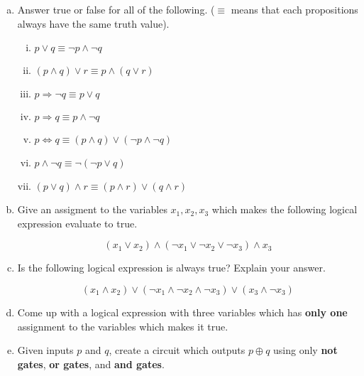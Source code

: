 \documentclass[12pt,letterpaper]{article}
\newif\ifsol
\newcommand{\solt}{ \ifsol (T) \fi }
\newcommand{\solf}{ \ifsol (F) \fi }
\begin{document}
	\begin{enumerate}[a.]

		\item Answer true or false for all of the following. ($\equiv$ means that each propositions always have the same truth value). 
		\begin{enumerate}[i.]
			\item $p \lor q \equiv \neg p \land \neg q$ \solt
			\item $(p \land q) \lor r \equiv p \land (q \lor r)$ \solf
			\item $p \Rightarrow \neg q \equiv p \lor q$ \solt
			\item $p \Rightarrow q \equiv p \land \neg q$ \solf
			\item $p \Leftrightarrow q \equiv (p \land q) \lor (\neg p \land \neg q)$ \solt
			\item $p \land \neg q \equiv \neg (\neg p \lor q)$ \solt
			\item $(p \lor q) \land r \equiv (p \land r) \lor (q \land r)$ \solt
	\end{enumerate}


		\item Give an assigment to the variables $x_1,x_2,x_3$ which makes the following logical expression evaluate to true.

		$$(x_1 \lor x_2)\land (\neg x_1 \lor \neg x_2 \lor \neg x_3) \land x_3$$
		\begin{mdframed}
		\vspace{2cm}
		\end{mdframed}

		\item Is the following logical expression is always true? Explain your answer.

		$$(x_1 \land x_2)\lor (\neg x_1 \land \neg x_2 \land \neg x_3) \lor (x_3 \land \neg x_3) $$

			\begin{mdframed}
			\vspace{4cm}
			\end{mdframed}

		\item Come up with a logical expression with three variables which has \textbf{only one} assignment to the variables which makes it true.

			\begin{mdframed}
			\vspace{4cm}
			\end{mdframed}

		\item Given inputs $p$ and $q$, create a circuit which outputs $p \oplus q$ using only \textbf{not gates}, \textbf{or gates}, and \textbf{and gates}.


\end{enumerate}
\end{document}
